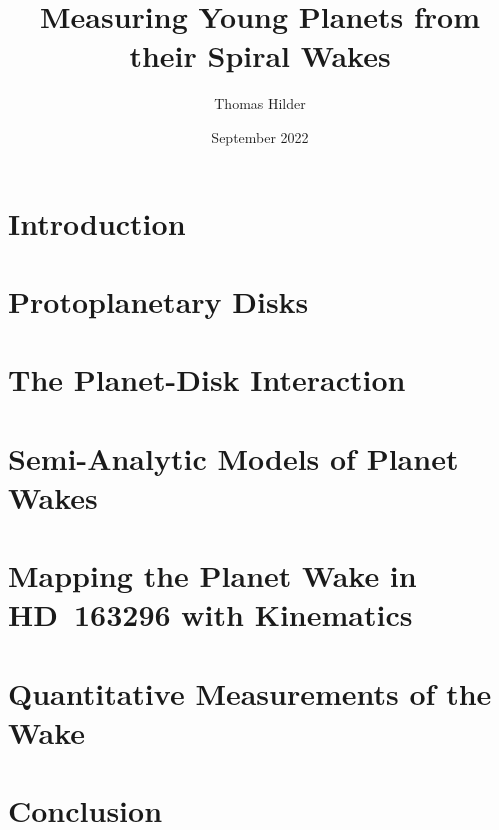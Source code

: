 \documentclass[hidelinks,11pt,a4paper,onecolumn]{report}
\title{Measuring Young Planets from their Spiral Wakes}
\author{Thomas Hilder}
\date{September 2022}
\begin{document}
    
    

    

    

    

    \tableofcontents
    \clearpage


    \chapter{Introduction}
    

    \chapter{Protoplanetary Disks}
    

    \chapter{The Planet-Disk Interaction}
    

    \chapter{Semi-Analytic Models of Planet Wakes} \label{ch:wake_models}
    

    \chapter{Mapping the Planet Wake in HD~163296 with Kinematics} \label{ch:wake_mapping}
    

    \chapter{Quantitative Measurements of the Wake}
    

    \chapter{Conclusion}
    

    \appendix
    

    
    
\end{document}
